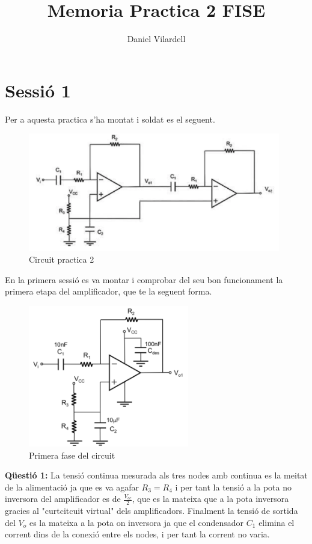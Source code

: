 \documentclass[12pt, a4papre]{article}
\author{Daniel Vilardell}
\title{Memoria Practica 2 FISE}
\date{}
\begin{document}
	\maketitle
	
	\tableofcontents
	
	\section{Sessió 1}
	
	Per a aquesta practica s'ha montat i soldat es el seguent.
	
	\begin{figure}[H]
		\begin{center}
		\includegraphics[width=110mm]{previ2_11.png}
		\caption{Circuit practica 2}
		\end{center}
	\end{figure}
	
	En la primera sessió es va montar i comprobar del seu bon funcionament la primera etapa del amplificador, que te la seguent forma.
	
	\begin{figure}[H]
		\begin{center}
		\includegraphics[width=70mm]{img_2_1.png}
		\caption{Primera fase del circuit}
		\end{center}
	\end{figure}
	
	\textbf{Qüestió 1:} La tensió continua mesurada als tres nodes amb continua es la meitat de la alimentació ja que es va agafar $R_3 = R_4$ i per tant la tensió a la pota no inversora del amplificador es de $\frac{V_{cc}}{2}$, que es la mateixa que a la pota inversora gracies al "curtcitcuit virtual" dels amplificadors. Finalment la tensió de sortida del $V_o$ es la mateixa a la pota on inversora ja que el condensador $C_1$ elimina el corrent dins de la conexió entre els nodes, i per tant la corrent no varia.
\end{document}
